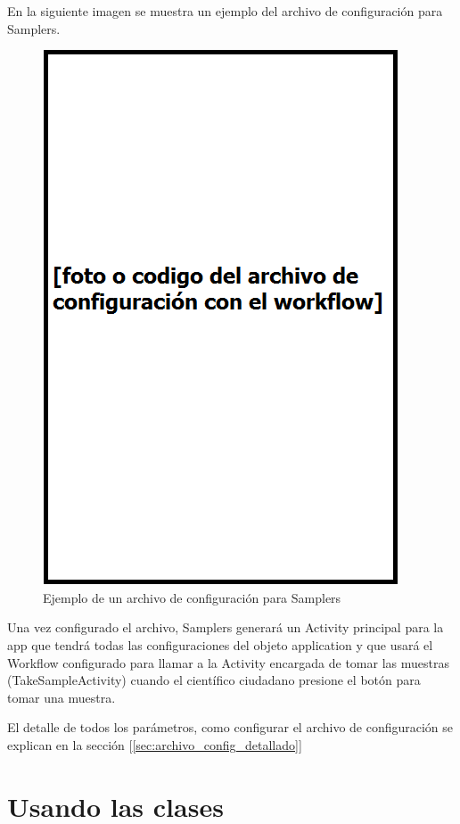 En la siguiente imagen se muestra un ejemplo del archivo de configuración para Samplers.
\begin{figure}[H]
  \centering
    \includegraphics[scale=0.8]{05-implementacion/archivo_config_ejemplo.png} 
   \caption{Ejemplo de un archivo de configuración para Samplers}
\end{figure}

Una vez configurado el archivo, Samplers generará un Activity principal para la app que tendrá todas las configuraciones del objeto application y que usará el Workflow configurado para llamar a la Activity encargada de tomar las muestras (TakeSampleActivity) cuando el científico ciudadano presione el botón para tomar una muestra.

El detalle de todos los parámetros, como configurar el archivo de configuración se explican en la sección [\ref{sec:archivo_config_detallado}]


\section{Usando las clases} \label{sec:usando_las_clases}

